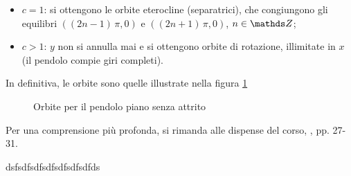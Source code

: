 {\begin{enumerate}
\begin{itemize}
\[            \]
            \item $ c=1 $: si ottengono le orbite eterocline (separatrici), che congiungono gli equilibri $ \left((2n-1)\,\pi,0\right) $ e $ \left((2n+1)\,\pi,0\right) $, $ n \in \Z $;
            \item $ c>1 $: $ y $ non si annulla mai e si ottengono orbite di rotazione, illimitate in $ x $ (il pendolo compie giri completi). 
        \end{itemize}
        In definitiva, le orbite sono quelle illustrate nella figura \ref{fig:sodaufnaisdufjaiuhfaoisfjdaosi}
        \begin{figure}[H]
            \begin{center}
                
            \end{center}
            \caption{Orbite per il pendolo piano senza attrito}\label{fig:sodaufnaisdufjaiuhfaoisfjdaosi}
        \end{figure}

        Per una comprensione più profonda, si rimanda alle dispense del corso, \cite{dispense}, pp. 27-31.
    \end{enumerate}
}{dsfsdfsdfsdfsdfsdfsdfds}{}
